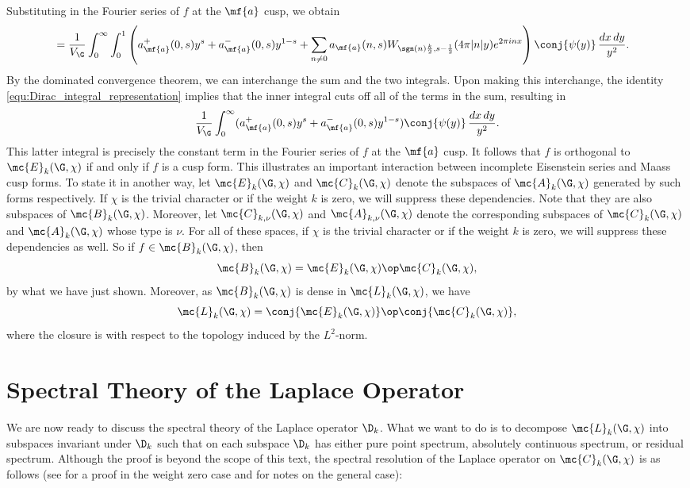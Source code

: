     Substituting in the Fourier series of $f$ at the $\mf{a}$ cusp, we obtain
    \begin{align*}
       &= \frac{1}{V_{\G}}\int_{0}^{\infty}\int_{0}^{1}\left(a_{\mf{a}}^{+}(0,s)y^{s}+a_{\mf{a}}^{-}(0,s)y^{1-s}+\sum_{n \neq 0}a_{\mf{a}}(n,s)W_{\sgn(n)\frac{k}{2},s-\frac{1}{2}}(4\pi|n|y)e^{2\pi inx}\right)\conj{\psi(y)}\,\frac{dx\,dy}{y^{2}}.
    \end{align*}
    By the dominated convergence theorem, we can interchange the sum and the two integrals. Upon making this interchange, the identity \cref{equ:Dirac_integral_representation} implies that the inner integral cuts off all of the terms in the sum, resulting in
    \[
      \frac{1}{V_{\G}}\int_{0}^{\infty}(a_{\mf{a}}^{+}(0,s)y^{s}+a_{\mf{a}}^{-}(0,s)y^{1-s})\conj{\psi(y)}\,\frac{dx\,dy}{y^{2}}.
    \]
    This latter integral is precisely the constant term in the Fourier series of $f$ at the $\mf{a}$ cusp. It follows that $f$ is orthogonal to $\mc{E}_{k}(\G,\chi)$ if and only if $f$ is a cusp form. This illustrates an important interaction between incomplete Eisenstein series and Maass cusp forms. To state it in another way, let $\mc{E}_{k}(\G,\chi)$ and $\mc{C}_{k}(\G,\chi)$ denote the subspaces of $\mc{A}_{k}(\G,\chi)$ generated by such forms respectively. If $\chi$ is the trivial character or if the weight $k$ is zero, we will suppress these dependencies. Note that they are also subspaces of $\mc{B}_{k}(\G,\chi)$. Moreover, let $\mc{C}_{k,\nu}(\G,\chi)$ and $\mc{A}_{k,\nu}(\G,\chi)$ denote the corresponding subspaces of $\mc{C}_{k}(\G,\chi)$ and $\mc{A}_{k}(\G,\chi)$ whose type is $\nu$. For all of these spaces, if $\chi$ is the trivial character or if the weight $k$ is zero, we will suppress these dependencies as well. So if $f \in \mc{B}_{k}(\G,\chi)$, then
    \[
      \mc{B}_{k}(\G,\chi) = \mc{E}_{k}(\G,\chi) \op \mc{C}_{k}(\G,\chi),
    \]
    by what we have just shown. Moreover, as $\mc{B}_{k}(\G,\chi)$ is dense in $\mc{L}_{k}(\G,\chi)$, we have
    \[
      \mc{L}_{k}(\G,\chi) = \conj{\mc{E}_{k}(\G,\chi)} \op \conj{\mc{C}_{k}(\G,\chi)},
    \]
    where the closure is with respect to the topology induced by the $L^{2}$-norm.
  \section{Spectral Theory of the Laplace Operator}
    We are now ready to discuss the spectral theory of the Laplace operator $\D_{k}$. What we want to do is to decompose $\mc{L}_{k}(\G,\chi)$ into subspaces invariant under $\D_{k}$ such that on each subspace $\D_{k}$ has either pure point spectrum, absolutely continuous spectrum, or residual spectrum. Although the proof is beyond the scope of this text, the spectral resolution of the Laplace operator on $\mc{C}_{k}(\G,\chi)$ is as follows (see \cite{iwaniec2002spectral} for a proof in the weight zero case and \cite{cohenmodular2017} for notes on the general case):

